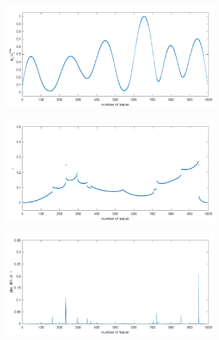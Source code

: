 \documentclass[preprint, 10pt]{elsarticle}
\begin{document}
\begin{figure}[H]
\begin{subfigure}[b]{0.5\textwidth}
\includegraphics*[width =\linewidth]{./figs/velocity_loc20_268}
\caption{}
\end{subfigure}%
\begin{subfigure}[b]{0.5\textwidth}
\includegraphics*[width =\linewidth]{./figs/tort_local20_268}
\caption{}
\end{subfigure}
\begin{subfigure}[b]{0.5\textwidth}
\includegraphics*[width =\linewidth]{./figs/diff_tort20_268}
\caption{}
\end{subfigure}%
\begin{subfigure}[b]{0.5\textwidth}

\end{subfigure}
\end{figure}
\end{document}

